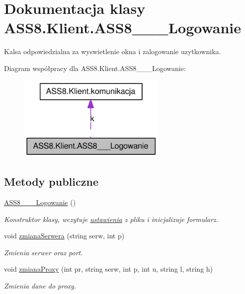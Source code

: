 \hypertarget{a00001}{
\section{Dokumentacja klasy ASS8.Klient.ASS8\_\-\_\-\_\-Logowanie}
\label{d8/d84/a00001}
}
Kalsa odpowiedzialna za wyswietlenie okna i zalogowanie uzytkownika.  


Diagram współpracy dla ASS8.Klient.ASS8\_\-\_\-\_\-Logowanie:\nopagebreak
\begin{figure}[H]
\begin{center}
\leavevmode
\includegraphics[width=202pt]{de/d38/a00160}
\end{center}
\end{figure}
\subsection*{Metody publiczne}
\begin{CompactItemize}
\item 
\hyperlink{a00001_d0767c13bd195aca9caa3e204ea140fe}{ASS8\_\-\_\-\_\-Logowanie} ()
\begin{CompactList}\small\item\em Konstruktor klasy, wczytuje \hyperlink{a00028}{ustawienia} z pliku i inicjalizuje formularz. \item\end{CompactList}\item 
void \hyperlink{a00001_677511611d58aa6b3b6e020334effe5b}{zmianaSerwera} (string serw, int p)
\begin{CompactList}\small\item\em Zmienia serwer oraz port. \item\end{CompactList}\item 
void \hyperlink{a00001_217558400fcf4848e5e455a1be4a012a}{zmianaProxy} (int pr, string serw, int p, int u, string l, string h)
\begin{CompactList}\small\item\em Zmienia dane do proxy. \item\end{CompactList}\end{CompactItemize}
